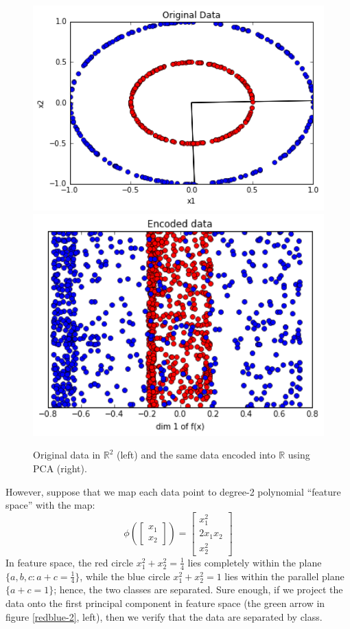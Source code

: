 \documentclass[]{article}
\newcommand{\reals}{\mathbb{R}}
\begin{document}
\begin{figure}[h]
\begin{center}
\includegraphics[scale=0.4]{figures/nonsep_data.png}
\quad \quad
\includegraphics[scale=0.4]{figures/nonsep_data_pca.png}
\caption{Original data in $\reals^2$ (left) and the same data encoded into $\reals$ using PCA (right).}
\label{redblue}
\end{center}
\end{figure}

However, suppose that we map each data point to  degree-2 polynomial ``feature space'' with the map:
$$ \phi \left(\begin{bmatrix} x_1 \\ x_2 \end{bmatrix} \right) = \begin{bmatrix} x_1^2 \\ 2x_1 x_2 \\ x_2^2 \end{bmatrix} $$
In feature space, the red circle $x_1^2 + x_2^2 = \frac{1}{4}$ lies completely within the plane $\{a, b, c : a + c = \frac{1}{4} \}$, while the blue circle $x_1^2 + x_2^2 = 1$ lies within the parallel plane $\{a + c = 1 \}$; hence, the two classes are separated.
Sure enough, if we project the data onto the first principal component in feature space (the green arrow in figure \ref{redblue-2}, left), then we verify that the data are separated by class.
\end{document}
